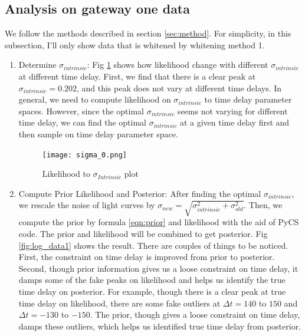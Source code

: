 \documentclass[\docopts]{\docclass}
\begin{document}
\subsection{Analysis on gateway one data}
We follow the methods described in section \ref{sec:method}.  For simplicity, in this subsection, I'll only show data that is whitened by whitening method 1. 
\begin{enumerate}
\item Determine $\sigma_{intrinsic}$: 
Fig \ref{fig:sigma1} shows how likelihood change with different $\sigma_{intrinsic}$ at different time delay. First, we find that there is a clear peak at $\sigma_{intrinsic}=0.202$, and this peak does not vary at different time delays. In general, we need to compute likelihood on $\sigma_{intrinsic}$ to time delay parameter spaces. However, since the optimal $\sigma_{intrinsic}$ seems not varying for different time delay, we can find the optimal $\sigma_{intrinsic}$ at a given time delay first and then sample on time delay parameter space. 
\begin{figure}[!h]
\texttt{[image: sigma\_0.png]}
\caption{Likelihood to $\sigma_{Intrinsic}$ plot}
\label{fig:sigma1}
\end{figure}

\item Compute Prior Likelihood and Posterior:
After finding the optimal $\sigma_{intrinsic}$, we rescale the noise of light curves by $\sigma_{new}=\sqrt{\sigma_{intrinsic}^2+\sigma_{old}^2}$. Then, we compute the prior by formula \ref{eqn:prior} and likelihood with the aid of PyCS code. The prior and likelihood will be combined to get posterior. Fig \ref{fig:log_data1} shows the result.  There are couples of things to be noticed. First, the constraint on time delay is improved from prior to posterior. Second, though prior information gives us a loose constraint on time delay, it damps some of the fake peaks on likelihood and helps us identify the true time delay on posterior. For example, though there is a clear peak at true time  delay on likelihood, there are some fake outliers at  $\Delta t =140$ to $150$ and $\Delta t =-130$ to $-150$. The prior, though gives a loose constraint on time delay, damps these outliers, which helps us identified true time delay from posterior. 


\end{enumerate}
\end{document}
